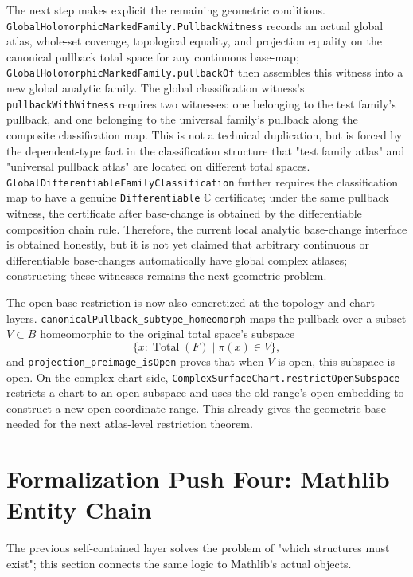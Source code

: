 \documentclass[UTF8,a4paper,11pt]{article}
\begin{document}
\par
The next step makes explicit the remaining geometric conditions.
\texttt{GlobalHolomorphic\allowbreak Marked\allowbreak Family\allowbreak.Pullback\allowbreak Witness} records an actual global atlas, whole-set coverage, topological equality, and projection equality on the canonical pullback total space for any continuous base-map;
\texttt{GlobalHolomorphic\allowbreak Marked\allowbreak Family\allowbreak.pullbackOf} then assembles this witness into a new global analytic family.
The global classification witness's \texttt{pullbackWithWitness} requires two witnesses: one belonging to the test family's pullback, and one belonging to the universal family's pullback along the composite classification map.
This is not a technical duplication, but is forced by the dependent-type fact in the classification structure that "test family atlas" and "universal pullback atlas" are located on different total spaces.
\texttt{GlobalDifferentiable\allowbreak Family\allowbreak Classification} further requires the classification map to have a genuine
\texttt{Differentiable\allowbreak} \(\mathbb C\) certificate; under the same pullback witness, the certificate after base-change is obtained by the differentiable composition chain rule.
Therefore, the current local analytic base-change interface is obtained honestly, but it is not yet claimed that arbitrary continuous or differentiable base-changes automatically have global complex atlases; constructing these witnesses remains the next geometric problem.
\par
The open base restriction is now also concretized at the topology and chart layers. \texttt{canonicalPullback\_subtype\_homeomorph} maps
the pullback over a subset \(V\subset B\) homeomorphic to the original total space's subspace
\[
  \{x:\operatorname{Total}(F)\mid \pi(x)\in V\},
\]
and \texttt{projection\_preimage\_isOpen} proves that when \(V\) is open, this subspace is open.
On the complex chart side, \texttt{ComplexSurfaceChart\allowbreak.restrictOpenSubspace} restricts a chart to an open subspace and uses the old range's open embedding to construct a new open coordinate range. This already gives the geometric base needed for the next atlas-level restriction theorem.

\section{Formalization Push Four: Mathlib Entity Chain}

The previous self-contained layer solves the problem of "which structures must exist"; this section connects the same logic to Mathlib's actual objects.
\end{document}
